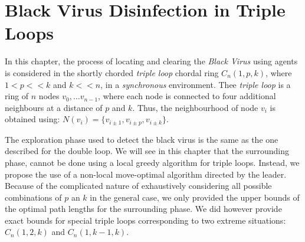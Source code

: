


\chapter {Black Virus Disinfection in Triple Loops}
\label{TL}
 


In this chapter, the process of locating and clearing the {\it Black Virus} using agents is considered in the shortly chorded {\it triple loop} chordal ring $C_n(1,p,k)$, where $1<p<<k$ and $k <<n$,  in a {\it synchronous} environment.  Thee {\it triple loop}   is a    ring of $n$ nodes $v_0, \ldots v_{n-1}$, where each node is connected to four additional neighbours at a distance of $p$ and $k$. Thus, the neighbourhood of node $v_i$ is obtained using: $N(v_{i})=\{v_{i\pm1},v_{i\pm p},v_{i\pm k}\}$.

The exploration phase used to detect the black virus is the same as the one described for the double loop. We will see in this chapter that the surrounding phase, cannot be done using a local greedy algorithm for triple loops. Instead, we propose the use of a non-local move-optimal algorithm directed by the leader. 
Because of the complicated nature of exhaustively considering all possible combinations of  $p$ an $k$ in the general case, we only provided the upper bounds of the optimal path lengths for the surrounding phase. We did however provide exact bounds for   special  triple loops  corresponding to two   extreme situations: $C_n(1,2,k)$   and $C_n(1,k-1,k)$.   

 



  
 

